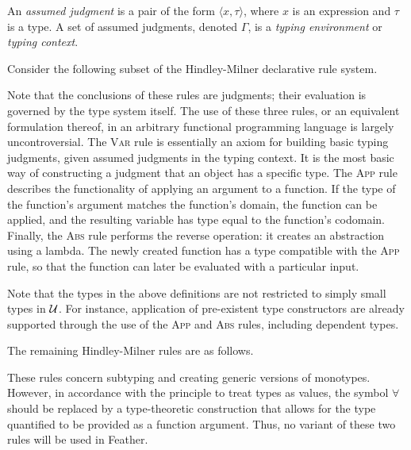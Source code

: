 \documentclass[11pt]{book}
\begin{document}
\begin{defn}
    An \textit{assumed judgment} is a pair of the form \( \langle x, \tau \rangle \), where \( x \) is an expression and \( \tau \) is a type.
    A set of assumed judgments, denoted \( \Gamma \), is a \textit{typing environment} or \textit{typing context}.
\end{defn}
Consider the following subset of the Hindley-Milner declarative rule system.
Note that the conclusions of these rules are judgments; their evaluation is governed by the type system itself.
The use of these three rules, or an equivalent formulation thereof, in an arbitrary functional programming language is largely uncontroversial.
The \textsc{Var} rule is essentially an axiom for building basic typing judgments, given assumed judgments in the typing context.
It is the most basic way of constructing a judgment that an object has a specific type.
The \textsc{App} rule describes the functionality of applying an argument to a function.
If the type of the function's argument matches the function's domain, the function can be applied, and the resulting variable has type equal to the function's codomain.
Finally, the \textsc{Abs} rule performs the reverse operation: it creates an abstraction using a lambda.
The newly created function has a type compatible with the \textsc{App} rule, so that the function can later be evaluated with a particular input.

Note that the types in the above definitions are not restricted to simply small types in \( \mathcal{U} \).
For instance, application of pre-existent type constructors are already supported through the use of the \textsc{App} and \textsc{Abs} rules, including dependent types.

The remaining Hindley-Milner rules are as follows.
These rules concern subtyping and creating generic versions of monotypes.
However, in accordance with the principle to treat types as values, the symbol \( \forall \) should be replaced by a type-theoretic construction that allows for the type quantified to be provided as a function argument.
Thus, no variant of these two rules will be used in Feather.
\end{document}
